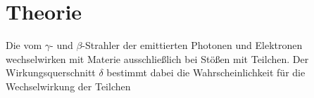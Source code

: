\section{Theorie}
\label{sec:Theorie}

Die vom $\gamma$- und $\beta$-Strahler der emittierten Photonen und Elektronen
wechselwirken mit Materie ausschließlich bei Stößen mit Teilchen.
Der Wirkungsquerschnitt $\delta$ bestimmt dabei die Wahrscheinlichkeit für 
die Wechselwirkung der Teilchen